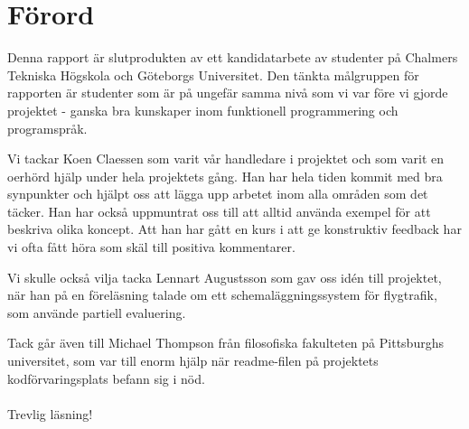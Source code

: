 \documentclass[Rapport]{subfiles}
\begin{document}
\section*{Förord}

Denna rapport är slutprodukten av ett kandidatarbete av studenter på
Chalmers Tekniska Högskola och Göteborgs Universitet. Den tänkta målgruppen för
rapporten är studenter som är på ungefär samma nivå som vi var före vi
gjorde projektet - ganska bra kunskaper inom funktionell programmering och
programspråk.

Vi tackar Koen Claessen som varit vår handledare i projektet och som varit en
oerhörd hjälp under hela projektets gång. Han har hela tiden kommit med bra
synpunkter och hjälpt oss att lägga upp arbetet inom alla områden
som det täcker. Han har också uppmuntrat oss till att alltid använda
exempel för att beskriva olika koncept. Att han har gått en kurs i att ge
konstruktiv feedback har vi ofta fått höra som skäl till positiva kommentarer. 

Vi skulle också vilja tacka Lennart Augustsson som gav oss idén till projektet,
när han på en föreläsning talade om ett schemaläggningssystem för flygtrafik,
som använde partiell evaluering.

Tack går även till Michael Thompson från filosofiska fakulteten på Pittsburghs 
universitet, som var till enorm hjälp när readme-filen på projektets kodförvaringsplats
befann sig i nöd. %

\paragraph{} Trevlig läsning! %
        
        
\end{document}
